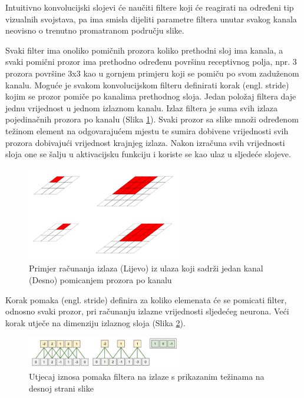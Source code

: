 \documentclass[times, utf8, proizvoljni, numeric]{fer}
\begin{document}
Intuitivno konvolucijski slojevi će naučiti filtere koji će reagirati na određeni tip vizualnih svojstava, pa ima smisla dijeliti parametre filtera unutar svakog kanala neovisno o trenutno promatranom području slike.

Svaki filter ima onoliko pomičnih prozora koliko prethodni sloj ima kanala, a svaki pomični prozor ima prethodno određenu površinu receptivnog polja, npr. 3 prozora površine 3x3 kao u gornjem primjeru koji se pomiču po svom zaduženom kanalu. Moguće je svakom konvolucijskom filteru definirati korak (engl. stride) kojim se prozor pomiče po kanalima prethodnog sloja. Jedan položaj filtera daje jednu vrijednost u jednom izlaznom kanalu. Izlaz filtera je suma svih izlaza pojedinačnih prozora po kanalu (Slika \ref{fg:konvolucija}). Svaki prozor sa slike množi određenom težinom element na odgovarajućem mjestu te sumira dobivene vrijednosti svih prozora dobivajući vrijednost krajnjeg izlaza. Nakon izračuna svih vrijednosti sloja one se šalju u aktivacijsku funkciju i koriste se kao ulaz u sljedeće slojeve. 

\begin{figure}[!ht]
	\begin{center}
		\captionsetup{justification=centering}
		\includegraphics[width=0.6\textwidth]{./imgs/konvolucija.png}
		\caption{Primjer računanja izlaza (Lijevo) iz ulaza koji sadrži jedan kanal (Desno) pomicanjem prozora po kanalu \cite{DubokoUcenje}}
		\label{fg:konvolucija}
	\end{center}
\end{figure}

Korak pomaka (engl. stride) definira za koliko elemenata će se pomicati filter, odnosno svaki prozor, pri računanju izlazne vrijednosti sljedećeg neurona. Veći korak utječe na dimenziju izlaznog sloja (Slika \ref{fg:pomak}).

\begin{figure}[!ht]
	\begin{center}
		\captionsetup{justification=centering}
		\includegraphics[width=0.6\textwidth]{./imgs/pomak.png}
		\caption{Utjecaj iznosa pomaka filtera na izlaze s prikazanim težinama na desnoj strani slike \cite{CS231n}}
		\label{fg:pomak}
	\end{center}
\end{figure}
\end{document}
